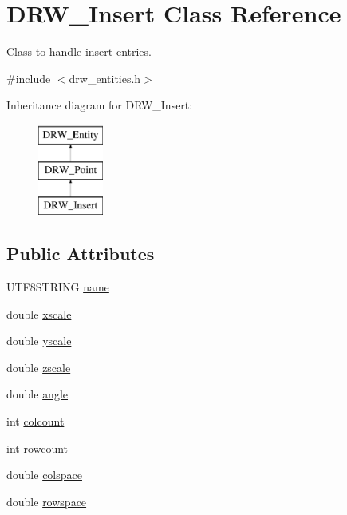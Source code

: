 \hypertarget{class_d_r_w___insert}{}\section{D\+R\+W\+\_\+\+Insert Class Reference}
\label{class_d_r_w___insert}


Class to handle insert entries.  




{\ttfamily \#include $<$drw\+\_\+entities.\+h$>$}

Inheritance diagram for D\+R\+W\+\_\+\+Insert\+:\begin{figure}[H]
\begin{center}
\leavevmode
\includegraphics[height=3.000000cm]{df/d4f/class_d_r_w___insert}
\end{center}
\end{figure}
\subsection*{Public Attributes}
\begin{DoxyCompactItemize}
\item 
U\+T\+F8\+S\+T\+R\+I\+N\+G \hyperlink{class_d_r_w___insert_aac767b55f89a1ba2f95a01573dde4302}{name}
\item 
double \hyperlink{class_d_r_w___insert_a7b9b914c2570967914074f374ddbe9ef}{xscale}
\item 
double \hyperlink{class_d_r_w___insert_a412f380485be38075b05976337102a47}{yscale}
\item 
double \hyperlink{class_d_r_w___insert_a0f1cd0ef6b837894679b1135ce4bb132}{zscale}
\item 
double \hyperlink{class_d_r_w___insert_ad685a40847d4a5a8458ecaff2ccc4f3d}{angle}
\item 
int \hyperlink{class_d_r_w___insert_acd0f0491349b2159c6009634f883c3e7}{colcount}
\item 
int \hyperlink{class_d_r_w___insert_ac9bc5494805108fd83f5e1851d12b90b}{rowcount}
\item 
double \hyperlink{class_d_r_w___insert_a4fe4d62a16d3288286004aa8dd49acb6}{colspace}
\item 
double \hyperlink{class_d_r_w___insert_af9dde2e71b5fc348b0018c0e5c74d9cf}{rowspace}
\end{DoxyCompactItemize}
